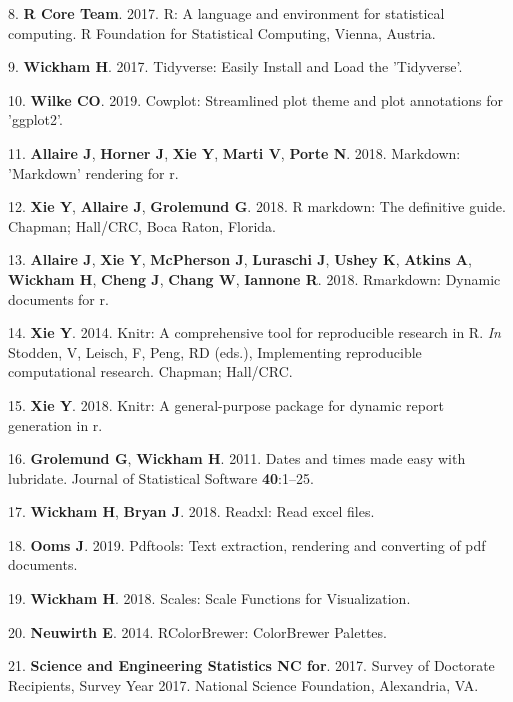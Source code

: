 \documentclass[10pt,]{article}
\begin{document}
\hypertarget{ref-R_software_2017}{}
8. \textbf{R Core Team}. 2017. R: A language and environment for
statistical computing. R Foundation for Statistical Computing, Vienna,
Austria.

\hypertarget{ref-wickham_tidyverse_2017}{}
9. \textbf{Wickham H}. 2017. Tidyverse: Easily Install and Load the
'Tidyverse'.

\hypertarget{ref-cowplot}{}
10. \textbf{Wilke CO}. 2019. Cowplot: Streamlined plot theme and plot
annotations for 'ggplot2'.

\hypertarget{ref-markdown}{}
11. \textbf{Allaire J}, \textbf{Horner J}, \textbf{Xie Y}, \textbf{Marti
V}, \textbf{Porte N}. 2018. Markdown: 'Markdown' rendering for r.

\hypertarget{ref-rmd_book}{}
12. \textbf{Xie Y}, \textbf{Allaire J}, \textbf{Grolemund G}. 2018. R
markdown: The definitive guide. Chapman; Hall/CRC, Boca Raton, Florida.

\hypertarget{ref-rmd_rstudio}{}
13. \textbf{Allaire J}, \textbf{Xie Y}, \textbf{McPherson J},
\textbf{Luraschi J}, \textbf{Ushey K}, \textbf{Atkins A},
\textbf{Wickham H}, \textbf{Cheng J}, \textbf{Chang W}, \textbf{Iannone
R}. 2018. Rmarkdown: Dynamic documents for r.

\hypertarget{ref-knitr_2014}{}
14. \textbf{Xie Y}. 2014. Knitr: A comprehensive tool for reproducible
research in R. \emph{In} Stodden, V, Leisch, F, Peng, RD (eds.),
Implementing reproducible computational research. Chapman; Hall/CRC.

\hypertarget{ref-knitr_2018}{}
15. \textbf{Xie Y}. 2018. Knitr: A general-purpose package for dynamic
report generation in r.

\hypertarget{ref-lubridate}{}
16. \textbf{Grolemund G}, \textbf{Wickham H}. 2011. Dates and times made
easy with lubridate. Journal of Statistical Software \textbf{40}:1--25.

\hypertarget{ref-readxl}{}
17. \textbf{Wickham H}, \textbf{Bryan J}. 2018. Readxl: Read excel
files.

\hypertarget{ref-pdftools}{}
18. \textbf{Ooms J}. 2019. Pdftools: Text extraction, rendering and
converting of pdf documents.

\hypertarget{ref-wickham_scales_2018}{}
19. \textbf{Wickham H}. 2018. Scales: Scale Functions for Visualization.

\hypertarget{ref-neuwirth_rcolorbrewer_2014}{}
20. \textbf{Neuwirth E}. 2014. RColorBrewer: ColorBrewer Palettes.

\hypertarget{ref-nsf_survey_2017}{}
21. \textbf{Science and Engineering Statistics NC for}. 2017. Survey of
Doctorate Recipients, Survey Year 2017. National Science Foundation,
Alexandria, VA.
\end{document}
